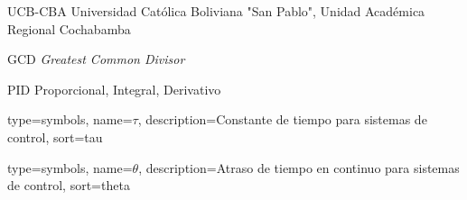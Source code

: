 
%
%

            {UCB-CBA}  %
            {Universidad Católica Boliviana "San Pablo", Unidad Académica Regional Cochabamba} %

%
%

            {GCD} %
            {\textit{Greatest Common Divisor}} %
            
            {PID} %
            {Proporcional, Integral, Derivativo} %


{
    type=symbols,   %
    name={\ensuremath{\tau}}, %
    description={Constante de tiempo para sistemas de control}, %
    sort=tau %
}

{
    type=symbols,
    name={\ensuremath{\theta}},
    description={Atraso de tiempo en continuo para sistemas de control},
    sort=theta
}